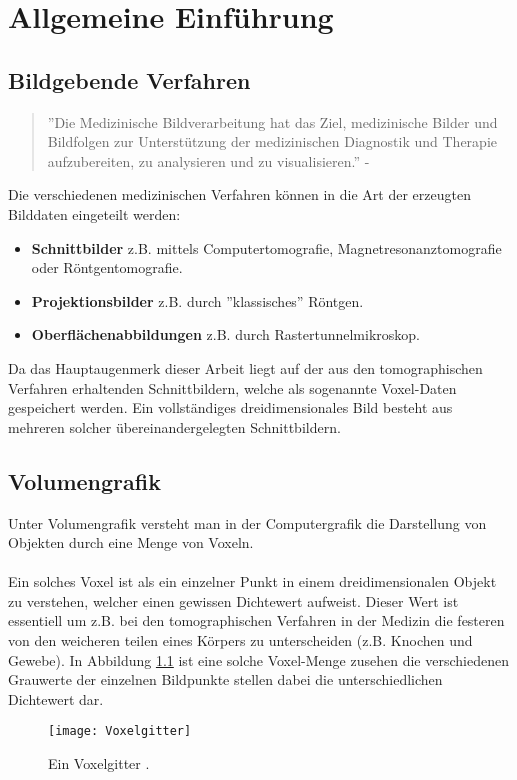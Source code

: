 \chapter{Allgemeine Einführung}

\section{Bildgebende Verfahren}
\begin{quote}
	''Die Medizinische Bildverarbeitung hat das Ziel, medizinische Bilder und Bildfolgen zur Unterstützung der medizinischen Diagnostik und Therapie aufzubereiten, zu analysieren und zu visualisieren.'' - \citep{MedBildVerarbeitung}
\end{quote}
Die verschiedenen medizinischen Verfahren können in die Art der erzeugten Bilddaten eingeteilt werden:
\begin{itemize}
	\item \textbf{Schnittbilder} z.B. mittels Computertomografie, Magnetresonanztomografie oder Röntgentomografie.
	\item \textbf{Projektionsbilder} z.B. durch ''klassisches'' Röntgen.
	\item \textbf{Oberflächenabbildungen} z.B. durch Rastertunnelmikroskop.
\end{itemize}
Da das Hauptaugenmerk dieser Arbeit liegt auf der aus den tomographischen Verfahren erhaltenden Schnittbildern, welche als sogenannte Voxel-Daten gespeichert werden. Ein vollständiges dreidimensionales Bild besteht aus mehreren solcher übereinandergelegten Schnittbildern.

\section{Volumengrafik}
Unter Volumengrafik versteht man in der Computergrafik die Darstellung von Objekten durch eine Menge von Voxeln. 
\\\\
Ein solches Voxel ist als ein einzelner Punkt in einem dreidimensionalen Objekt zu verstehen, welcher einen gewissen Dichtewert aufweist. Dieser Wert ist essentiell um z.B. bei den tomographischen Verfahren in der Medizin die festeren von den weicheren teilen eines Körpers zu unterscheiden (z.B. Knochen und Gewebe). In Abbildung \ref{fig:Voxelgitter} ist eine solche Voxel-Menge zusehen die verschiedenen Grauwerte der einzelnen Bildpunkte stellen dabei die unterschiedlichen Dichtewert dar.

\begin{figure}
	\centering
	\texttt{[image: Voxelgitter]}
	\caption{Ein Voxelgitter \citep{SeibtBak}.}
	\label{fig:Voxelgitter}
\end{figure}

